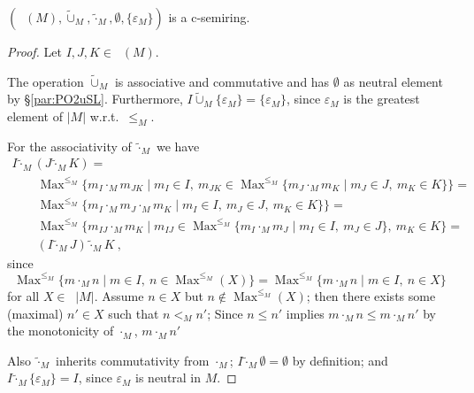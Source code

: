 \documentclass[english]{notes}
\DeclareMathOperator{\Maxop}{\mathrm{Max}}
\newcommand{\Max}[1]{\Maxop^{#1}}
\DeclareMathOperator{\finsets}{\mathcal{P}_{\mathrm{fin}}}
\DeclareMathOperator{\incsets}{\mathcal{I}}
\DeclareMathOperator{\incfinsets}{\incsets_{\mathrm{fin}}}
\newcommand{\mtimes}[1]{\mathbin{\tilde{\cdot}_{#1}}}
\newcommand{\mplus}[1]{\mathbin{\tilde{\cup}_{#1}}}
\begin{document}
\begin{lemma}\label{lem:join-monoid-2-c-semiring}
$(\incfinsets(M), \mplus{M}, \mtimes{M}, \emptyset, \{
\varepsilon_M \})$ is a c-semiring.
\end{lemma}
\begin{proof}
Let $I, J, K \in \incfinsets(M)$.

The operation $\mplus{M}$ is associative and commutative and has
$\emptyset$ as neutral element by §\ref{par:PO2uSL}.  Furthermore, $I
\mplus{M} \{ \varepsilon_M \} = \{ \varepsilon_M \}$, since
$\varepsilon_M$ is the greatest element of $|M|$ w.r.t.\ $\leq_M$.

For the associativity of ${\mtimes{M}}$ we have
%
\begin{gather*}
  I \mtimes{M} (J \mtimes{M} K)
={}\\\qquad
  \Max{\leq_M} \{ m_I \cdot_M m_{JK} \mid m_I \in I,\ m_{JK} \in \Max{\leq_M}\{ m_J \cdot_M m_K \mid m_J \in J,\ m_K \in K \} \}
={}\\\qquad
  \Max{\leq_M} \{ m_I \cdot_M m_J \cdot_M m_K \mid m_I \in I,\ m_J \in J,\ m_K \in K \} \}
={}\\\qquad
  \Max{\leq_M} \{ m_{IJ} \cdot_M m_K \mid m_{IJ} \in \Max{\leq_M}\{ m_I \cdot_M m_J \mid m_I \in I,\ m_J \in J \},\ m_K \in K \}
={}\\\qquad
  (I \mtimes{M} J) \mtimes{M} K
\ \text{,}
\end{gather*}
%
since
%
\begin{equation*}
  \Max{\leq_M}\{ m \cdot_M n \mid m \in I,\ n \in \Max{\leq_M}(X) \} =
  \Max{\leq_M}\{ m \cdot_M n \mid m \in I,\ n \in X \}
\end{equation*}
%
for all $X \in \finsets |M|$. 
Assume $n \in X$ but $n \not \in \Max{\leq_M}(X)$;
then there exists some (maximal) $n' \in X$ such that $n <_M n'$; 
Since $n \leq n'$ implies $m \cdot_M n \leq m \cdot_M n'$  by the monotonicity of
$\cdot_M$, $m \cdot_M n'$

Also $\mtimes{M}$ inherits commutativity from $\cdot_M$; $I \mtimes{M}
\emptyset = \emptyset$ by definition; and $I \mtimes{M} \{
\varepsilon_M \} = I$, since $\varepsilon_M$ is neutral in $M$.


\end{proof}
\end{document}
